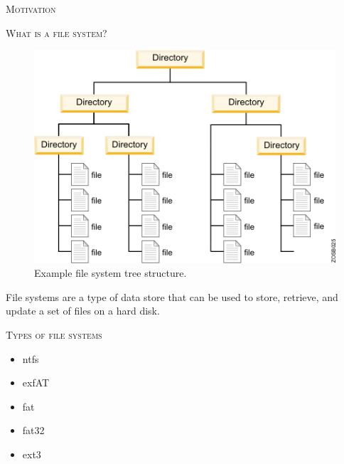 \documentclass[final,t]{beamer}
\begin{document}
\begin{frame}{}
\begin{columns}[t]
\begin{column}{.325\linewidth}
\begin{block}{\textsc{Motivation}}
        \end{block}

	\begin{block}{\textsc{What is a file system?}}

          \begin{figure}			
  	    \centering
            \includegraphics[scale=1.5]{fs.png}
            \vspace*{.05in}
	    \caption{Example file system tree structure.}

	  \end{figure}
          \vspace*{-.2in}
		File systems are a type of data store that can be used to store, retrieve, and update a set of files on a hard disk.
   	\end{block}

   	\begin{block}{\textsc{Types of file systems}}

          \begin{itemize}
          
            \item ntfs

            \item exfAT
            
            \item fat
            
            \item fat32
            
            \item ext3
            

\end{itemize}
\end{block}
\end{column}
\end{columns}
\end{frame}
\end{document}
